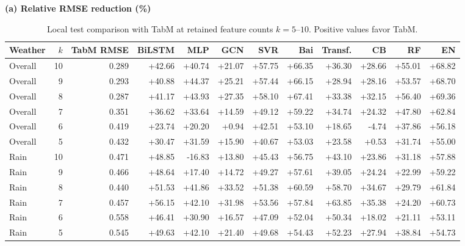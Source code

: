 \begin{table}[t]
\centering
\caption{Local test comparison with TabM at retained feature
counts $k=5$--$10$. Positive values favor TabM.}
\label{tab:Table04_Local_Ten_Model_Comparison}
\footnotesize
\setlength{\tabcolsep}{3pt}
\renewcommand{\arraystretch}{1.05}

\par\smallskip
\textbf{(a) Relative RMSE reduction (\%)}
\par\smallskip

\begin{tabular*}{\textwidth}{@{\extracolsep{\fill}}lrrrrrrrrrrr@{}}
\toprule
Weather & $k$ & TabM RMSE & BiLSTM & MLP & GCN &
SVR & Bai & Transf. & CB & RF & EN \\
\midrule

Overall & 10 & 0.289 & +42.66 & +40.74 & +21.07 & +57.75 & +66.35 & +36.30 & +28.66 & +55.01 & +68.82 \\
Overall & 9 & 0.293 & +40.88 & +44.37 & +25.21 & +57.44 & +66.15 & +28.94 & +28.16 & +53.57 & +68.70 \\
Overall & 8 & 0.287 & +41.17 & +43.93 & +27.35 & +58.10 & +67.41 & +33.38 & +32.15 & +56.40 & +69.36 \\
Overall & 7 & 0.351 & +36.62 & +33.64 & +14.59 & +49.12 & +59.22 & +34.74 & +24.32 & +47.80 & +62.84 \\
Overall & 6 & 0.419 & +23.74 & +20.20 & +0.94 & +42.51 & +53.10 & +18.65 & -4.74 & +37.86 & +56.18 \\
Overall & 5 & 0.432 & +30.47 & +31.59 & +15.90 & +40.67 & +53.03 & +23.58 & +0.53 & +31.74 & +55.00 \\
\midrule

Rain & 10 & 0.471 & +48.85 & -16.83 & +13.80 & +45.43 & +56.75 & +43.10 & +23.86 & +31.18 & +57.88 \\
Rain & 9 & 0.466 & +48.64 & +17.40 & +14.72 & +49.27 & +57.61 & +39.05 & +24.24 & +22.99 & +59.22 \\
Rain & 8 & 0.440 & +51.53 & +41.86 & +33.52 & +51.38 & +60.59 & +58.70 & +34.67 & +29.79 & +61.84 \\
Rain & 7 & 0.457 & +56.15 & +42.10 & +31.98 & +53.56 & +57.84 & +63.85 & +35.38 & +24.20 & +60.73 \\
Rain & 6 & 0.558 & +46.41 & +30.90 & +16.57 & +47.09 & +52.04 & +50.34 & +18.02 & +21.11 & +53.11 \\
Rain & 5 & 0.545 & +49.63 & +42.10 & +21.40 & +49.68 & +54.43 & +52.23 & +27.94 & +38.84 & +54.73 \\
\midrule


\end{tabular*}
\end{table}
